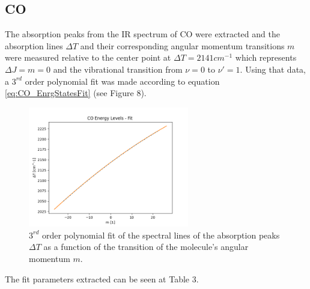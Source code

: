 \documentclass[reprint,amsmath,amssymb,aps, prl]{revtex4-2}
\begin{document}
\subsection{\label{subsec:level21}CO}
The absorption peaks from the IR spectrum of CO were extracted and the absorption lines
$\Delta T$ 
and their corresponding angular momentum transitions
$m$
were measured relative to the center point at $\Delta T=2141 cm^{-1}$ which represents $\Delta J = m = 0 $ and the vibrational transition from $\nu =0$ to $\nu' =1$. Using that data,
a $3^{rd}$ order polynomial fit was made according to equation \ref{eq:CO_EnrgStatesFit} (see Figure 8).
\begin{figure}[h!]
    \includegraphics[width=7cm]{Images/polynomial_3_fitting.png}
    \caption{$3^{rd}$ order polynomial fit of the spectral lines of the absorption peaks $\Delta T$ as a function of the transition of the molecule's
    angular momentum $m$. }
    \label{fig:COPolynomialfit}
    \centering
\end{figure}
The fit parameters extracted can be seen at Table 3. 
\begin{table}[h]
    \caption{Fit parameters of the $3^{rd}$ order polynomial fit}
    \label{COfittable}
    \end{table}
\end{document}
